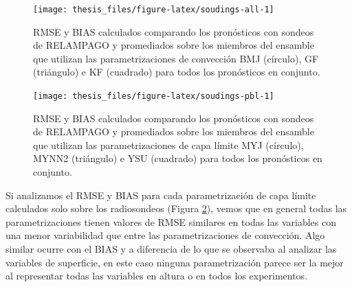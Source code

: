\documentclass[12pt,oneside,a4paper]{reedthesis}
\begin{document}
\begin{figure}

{\centering \texttt{[image: thesis\_files/figure-latex/soudings-all-1]} 

}

\caption{RMSE y BIAS calculados comparando los pronósticos con sondeos de RELAMPAGO y promediados sobre los miembros del ensamble que utilizan las parametrizaciones de convección BMJ (círculo), GF (triángulo) e KF (cuadrado) para todos los pronósticos en conjunto.}\label{fig:soudings-all}
\end{figure}

\begin{figure}

{\centering \texttt{[image: thesis\_files/figure-latex/soudings-pbl-1]} 

}

\caption{RMSE y BIAS calculados comparando los pronósticos con sondeos de RELAMPAGO y promediados sobre los miembros del ensamble que utilizan las parametrizaciones de capa límite MYJ (círculo), MYNN2 (triángulo) e YSU (cuadrado) para todos los pronósticos en conjunto.}\label{fig:soudings-pbl}
\end{figure}
Si analizamos el RMSE y BIAS para cada parametrización de capa límite calculados solo sobre los radiosondeos (Figura \ref{fig:soudings-pbl}), vemos que en general todas las parametrizaciones tienen valores de RMSE similares en todas las variables con una menor variabilidad que entre las parametrizaciones de convección. Algo similar ocurre con el BIAS y a diferencia de lo que se observaba al analizar las variables de superficie, en este caso ninguna parametrización parece ser la mejor al representar todas las variables en altura o en todos los experimentos.
\end{document}
